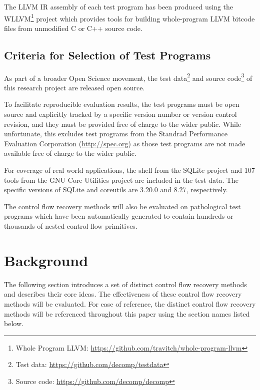 \documentclass[12pt, a4paper]{article}
\begin{document}
The LLVM IR assembly of each test program has been produced using the WLLVM\footnote{Whole Program LLVM: \url{https://github.com/travitch/whole-program-llvm}} project which provides tools for building whole-program LLVM bitcode files from unmodified C or C++ source code.


\subsection{Criteria for Selection of Test Programs}

As part of a broader Open Science movement, the test data\footnote{Test data: \url{https://github.com/decomp/testdata}} and source code\footnote{Source code: \url{https://github.com/decomp/decomp}} of this research project are released open source.

To facilitate reproducible evaluation results, the test programs must be open source and explicitly tracked by a specific version number or version control revision, and they must be provided free of charge to the wider public. While unfortunate, this excludes test programs from the Standrad Performance Evaluation Corporation (\url{http://spec.org}) as those test programs are not made available free of charge to the wider public.

For coverage of real world applications, the shell from the SQLite project and 107 tools from the GNU Core Utilities project are included in the test data. The specific versions of SQLite and coreutils are 3.20.0 and 8.27, respectively.

The control flow recovery methods will also be evaluated on pathological test programs which have been automatically generated to contain hundreds or thousands of nested control flow primitives.


\clearpage


\section{Background}

The following section introduces a set of distinct control flow recovery methods and describes their core ideas. The effectiveness of these control flow recovery methods will be evaluated. For ease of reference, the distinct control flow recovery methods will be referenced throughout this paper using the section names listed below.
\end{document}
